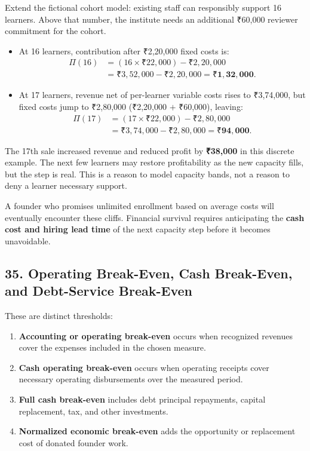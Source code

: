 Extend the fictional cohort model: existing staff can responsibly support 16 learners. Above that number, the institute needs an additional ₹60,000 reviewer commitment for the cohort.
\begin{itemize}
\item At 16 learners, contribution after ₹2,20,000 fixed costs is:
\begin{equation}
\begin{aligned}
\Pi(16) &= (16 \times ₹22,000) - ₹2,20,000 \\
&= ₹3,52,000 - ₹2,20,000 = \mathbf{₹1,32,000}.
\end{aligned}
\end{equation}
\item At 17 learners, revenue net of per-learner variable costs rises to ₹3,74,000, but fixed costs jump to ₹2,80,000 (₹2,20,000 $+$ ₹60,000), leaving:
\begin{equation}
\begin{aligned}
\Pi(17) &= (17 \times ₹22,000) - ₹2,80,000 \\
&= ₹3,74,000 - ₹2,80,000 = \mathbf{₹94,000}.
\end{aligned}
\end{equation}
\end{itemize}

The 17th sale increased revenue and reduced profit by \textbf{₹38,000} in this discrete example. The next few learners may restore profitability as the new capacity fills, but the step is real. This is a reason to model capacity bands, not a reason to deny a learner necessary support.

A founder who promises unlimited enrollment based on average costs will eventually encounter these cliffs. Financial survival requires anticipating the \textbf{cash cost and hiring lead time} of the next capacity step before it becomes unavoidable.

\subsection*{35. Operating Break-Even, Cash Break-Even, and Debt-Service Break-Even}

These are distinct thresholds:
\begin{enumerate}
\item \textbf{Accounting or operating break-even} occurs when recognized revenues cover the expenses included in the chosen measure.
\item \textbf{Cash operating break-even} occurs when operating receipts cover necessary operating disbursements over the measured period.
\item \textbf{Full cash break-even} includes debt principal repayments, capital replacement, tax, and other investments.
\item \textbf{Normalized economic break-even} adds the opportunity or replacement cost of donated founder work.
\end{enumerate}

